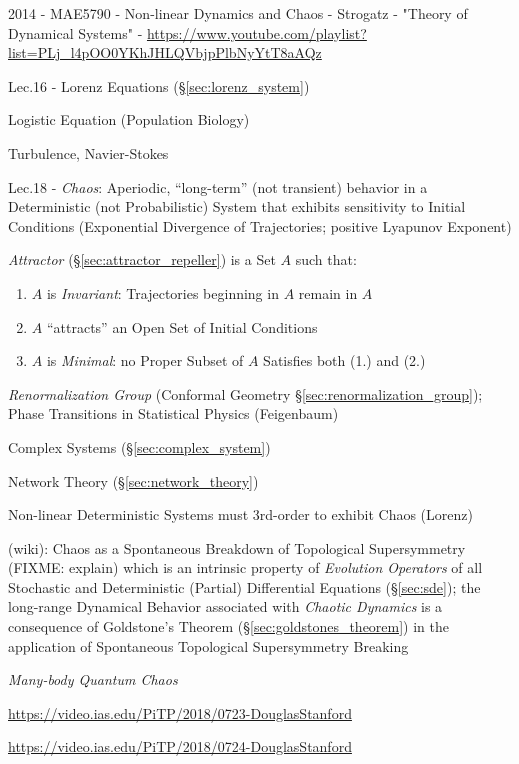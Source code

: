2014 - MAE5790 - Non-linear Dynamics and Chaos - Strogatz - "Theory of
Dynamical Systems" -
\url{https://www.youtube.com/playlist?list=PLj_l4pOO0YKhJHLQVbjpPlbNyYtT8aAQz}

Lec.16 - Lorenz Equations (\S\ref{sec:lorenz_system})

Logistic Equation (Population Biology)

Turbulence, Navier-Stokes

Lec.18 - \emph{Chaos}: Aperiodic, ``long-term'' (not transient) behavior in a
Deterministic (not Probabilistic) System that exhibits sensitivity to Initial
Conditions (Exponential Divergence of Trajectories; positive Lyapunov Exponent)

\emph{Attractor} (\S\ref{sec:attractor_repeller}) is a Set $A$ such that:
\begin{enumerate}
  \item $A$ is \emph{Invariant}: Trajectories beginning in $A$ remain in $A$
  \item $A$ ``attracts'' an Open Set of Initial Conditions
  \item $A$ is \emph{Minimal}: no Proper Subset of $A$ Satisfies both (1.) and
    (2.)
\end{enumerate}

\emph{Renormalization Group} (Conformal Geometry
\S\ref{sec:renormalization_group}); Phase Transitions in Statistical Physics
(Feigenbaum)

Complex Systems (\S\ref{sec:complex_system})

Network Theory (\S\ref{sec:network_theory})

Non-linear Deterministic Systems must 3rd-order to exhibit Chaos (Lorenz)

(wiki): Chaos as a Spontaneous Breakdown of Topological Supersymmetry (FIXME:
explain) which is an intrinsic property of \emph{Evolution Operators} of all
Stochastic and Deterministic (Partial) Differential Equations (\S\ref{sec:sde});
the long-range Dynamical Behavior associated with \emph{Chaotic Dynamics} is a
consequence of Goldstone's Theorem (\S\ref{sec:goldstones_theorem}) in the
application of Spontaneous Topological Supersymmetry Breaking

\asterism


\emph{Many-body Quantum Chaos}

\url{https://video.ias.edu/PiTP/2018/0723-DouglasStanford}

\url{https://video.ias.edu/PiTP/2018/0724-DouglasStanford}



